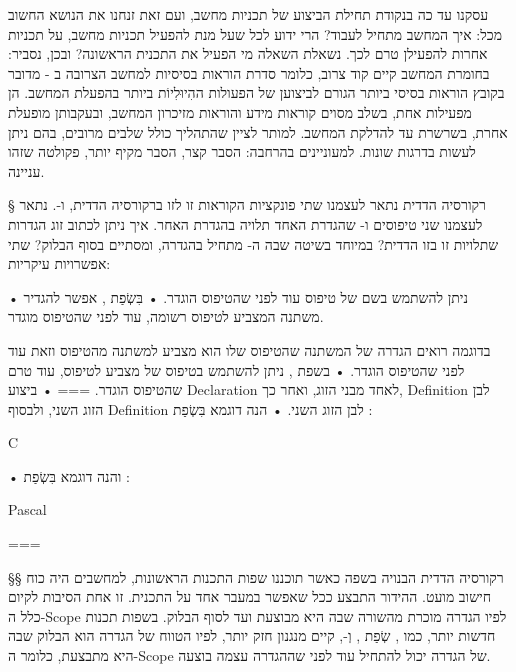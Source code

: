 עסקנו עד כה בנקודת תחילת הביצוע של תכניות מחשב, ועם זאת זנחנו את הנושא החשוב
מכל: איך המחשב מתחיל לעבוד? הרי ידוע לכל שעל מנת להפעיל תכניות מחשב, על תכניות
אחרות להפעילן טרם לכך. נשאלת השאלה מי הפעיל את התכנית הראשונה? ובכן, נסביר:
בחומרת המחשב קיים קוד צרוב, כלומר סדרת הוראות בסיסיות למחשב הצרובה
ב - מדובר בקובץ הוראות בסיסי ביותר הגורם לביצוען של
הפעולות ההִיוּלִיוֹת ביותר בהפעלת המחשב. הן מפעילות אחת, בשלב מסוים קוראות מידע
והוראות מזיכרון המחשב, ובעקבותן מופעלת אחרת, בשרשרת עד להדלקת המחשב. למותר
לציין שהתהליך כולל שלבים מרובים, בהם ניתן לעשות בדרגות שונות. למעוניינים
בהרחבה: הסבר קצר, הסבר מקיף יותר, פקולטה שזהו עניינה.

§ רקורסיה הדדית
נתאר לעצמנו שתי פונקציות הקוראות זו לזו ברקורסיה הדדית,  ו-.
נתאר לעצמנו שני טיפוסים  ו- שהגדרת האחד תלויה בהגדרת האחר.
איך ניתן לכתוב זוג הגדרות שתלויות זו בזו הדדית? במיוחד בשיטה שבה ה-
מתחיל בהגדרה, ומסתיים בסוף הבלוק?
שתי אפשרויות עיקריות:
\begin{enumerate}
• ניתן להשתמש בשם של טיפוס עוד לפני שהטיפוס הוגדר.
• בִּשְׂפַת , אפשר להגדיר משתנה המצביע לטיפוס רשומה, עוד לפני שהטיפוס מוגדר.



 בדוגמה רואים הגדרה של המשתנה  שהטיפוס שלו הוא מצביע למשתנה מהטיפוס  וזאת עוד לפני שהטיפוס  הוגדר.
• בשפת , ניתן להשתמש בטיפוס של מצביע לטיפוס, עוד טרם שהטיפוס הוגדר.
===
• ביצוע Declaration לאחד מבני הזוג, ואחר כך, Definition לבן הזוג השני, ולבסוף Definition לבן הזוג השני.
• הנה דוגמא בִּשְׂפַת :

{C}

• והנה דוגמא בִּשְׂפַת :

{Pascal}

===
\end{enumerate}

§§ רקורסיה הדדית הבנויה בשפה
כאשר תוכננו שפות התכנות הראשונות, למחשבים היה כוח חישוב מועט. ההידור התבצע ככל
שאפשר במעבר אחד על התכנית. זו אחת הסיבות לקיום כלל ה-Scope לפיו הגדרה מוכרת
מהשורה שבה היא מבוצעת ועד לסוף הבלוק. בשפות תכנות חדשות יותר, כמו , שְׂפַת
, וְ-, קיים מנגנון חזק יותר, לפיו הטווח של הגדרה הוא הבלוק שבה
היא מתבצעת, כלומר ה-Scope של הגדרה יכול להתחיל עוד לפני שההגדרה עצמה בוצעה.

